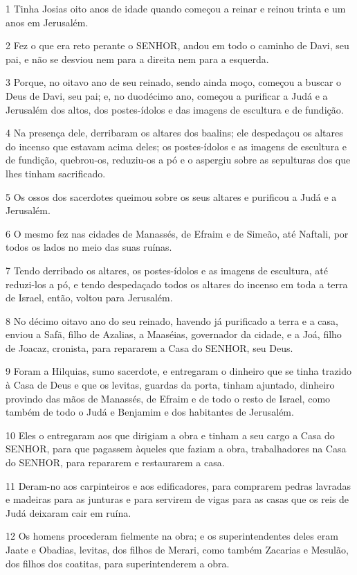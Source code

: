\par 1 Tinha Josias oito anos de idade quando começou a reinar e reinou trinta e um anos em Jerusalém.
\par 2 Fez o que era reto perante o SENHOR, andou em todo o caminho de Davi, seu pai, e não se desviou nem para a direita nem para a esquerda.
\par 3 Porque, no oitavo ano de seu reinado, sendo ainda moço, começou a buscar o Deus de Davi, seu pai; e, no duodécimo ano, começou a purificar a Judá e a Jerusalém dos altos, dos postes-ídolos e das imagens de escultura e de fundição.
\par 4 Na presença dele, derribaram os altares dos baalins; ele despedaçou os altares do incenso que estavam acima deles; os postes-ídolos e as imagens de escultura e de fundição, quebrou-os, reduziu-os a pó e o aspergiu sobre as sepulturas dos que lhes tinham sacrificado.
\par 5 Os ossos dos sacerdotes queimou sobre os seus altares e purificou a Judá e a Jerusalém.
\par 6 O mesmo fez nas cidades de Manassés, de Efraim e de Simeão, até Naftali, por todos os lados no meio das suas ruínas.
\par 7 Tendo derribado os altares, os postes-ídolos e as imagens de escultura, até reduzi-los a pó, e tendo despedaçado todos os altares do incenso em toda a terra de Israel, então, voltou para Jerusalém.
\par 8 No décimo oitavo ano do seu reinado, havendo já purificado a terra e a casa, enviou a Safã, filho de Azalias, a Maaséias, governador da cidade, e a Joá, filho de Joacaz, cronista, para repararem a Casa do SENHOR, seu Deus.
\par 9 Foram a Hilquias, sumo sacerdote, e entregaram o dinheiro que se tinha trazido à Casa de Deus e que os levitas, guardas da porta, tinham ajuntado, dinheiro provindo das mãos de Manassés, de Efraim e de todo o resto de Israel, como também de todo o Judá e Benjamim e dos habitantes de Jerusalém.
\par 10 Eles o entregaram aos que dirigiam a obra e tinham a seu cargo a Casa do SENHOR, para que pagassem àqueles que faziam a obra, trabalhadores na Casa do SENHOR, para repararem e restaurarem a casa.
\par 11 Deram-no aos carpinteiros e aos edificadores, para comprarem pedras lavradas e madeiras para as junturas e para servirem de vigas para as casas que os reis de Judá deixaram cair em ruína.
\par 12 Os homens procederam fielmente na obra; e os superintendentes deles eram Jaate e Obadias, levitas, dos filhos de Merari, como também Zacarias e Mesulão, dos filhos dos coatitas, para superintenderem a obra.
